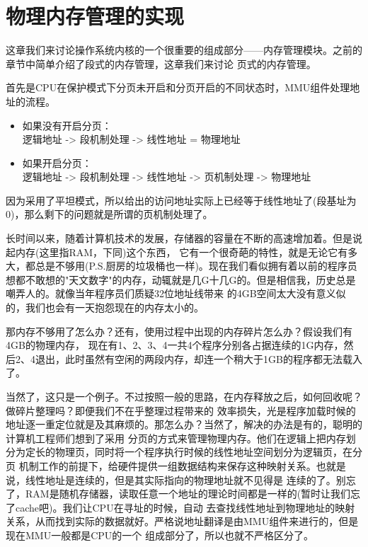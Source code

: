 
\section {物理内存管理的实现}

\par 这章我们来讨论操作系统内核的一个很重要的组成部分——内存管理模块。之前的章节中简单介绍了段式的内存管理，这章我们来讨论\allowbreak
页式的内存管理。

\par 首先是CPU在保护模式下分页未开启和分页开启的不同状态时，MMU组件处理地址的流程。

\begin{mdframed}
	\begin{itemize}
		\item 如果没有开启分页：\\ 逻辑地址 -> 段机制处理 -> 线性地址 = 物理地址
		\item 如果开启分页：\\ 逻辑地址 -> 段机制处理 -> 线性地址 -> 页机制处理 -> 物理地址
	\end{itemize}
\end{mdframed}

\par 因为采用了平坦模式，所以给出的访问地址实际上已经等于线性地址了(段基址为0)，那么剩下的问题就是所谓的页机制处理了。

\par 长时间以来，随着计算机技术的发展，存储器的容量在不断的高速增加着。但是说起内存(这里指RAM，下同)这个东西，\allowbreak
它有一个很奇葩的特性，就是无论它有多大，都总是不够用(P.S.厨房的垃圾桶也一样)。现在我们看似拥有着以前的程序员\allowbreak
想都不敢想的"天文数字"的内存，动辄就是几G十几G的。但是相信我，历史总是嘲弄人的。就像当年程序员们质疑32位地址线带来\allowbreak
的4GB空间太大没有意义似的，我们也会有一天抱怨现在的内存太小的。

\par 那内存不够用了怎么办？还有，使用过程中出现的内存碎片怎么办？假设我们有4GB的物理内存，\allowbreak
现在有1、2、3、4一共4个程序分别各占据连续的1G内存，然后2、4退出，此时虽然有空闲的两段内存，却连一个稍大于1GB的程序都无法载入了。

\par 当然了，这只是一个例子。不过按照一般的思路，在内存释放之后，如何回收呢？做碎片整理吗？即便我们不在乎整理过程带来的\allowbreak
效率损失，光是程序加载时候的地址逐一重定位就是及其麻烦的。那怎么办？当然了，解决的办法是有的，聪明的计算机工程师们想到了采用\allowbreak
分页的方式来管理物理内存。他们在逻辑上把内存划分为定长的物理页，同时将一个程序执行时候的线性地址空间划分为逻辑页，在分页\allowbreak
机制工作的前提下，给硬件提供一组数据结构来保存这种映射关系。也就是说，线性地址是连续的，但是其实际指向的物理地址就不见得是\allowbreak
连续的了。别忘了，RAM是随机存储器，读取任意一个地址的理论时间都是一样的(暂时让我们忘了cache吧)。我们让CPU在寻址的时候，自动\allowbreak
去查找线性地址到物理地址的映射关系，从而找到实际的数据就好。严格说地址翻译是由MMU组件来进行的，但是现在MMU一般都是CPU的一个\allowbreak
组成部分了，所以也就不严格区分了。

